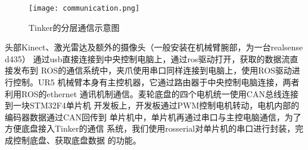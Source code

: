 \begin{figure}[ht] %
  \centering
  \texttt{[image: communication.png]}
  \caption{Tinker的分层通信示意图}
  \label{fig:communication}
\end{figure}

头部Kinect、激光雷达及额外的摄像头（一般安装在机械臂腕部，为一台realsense d435）
通过usb直接连接到中央控制电脑上，通过ros驱动打开，获取的数据流直接发布到
ROS的通信系统中，夹爪使用串口同样连接到电脑上，使用ROS驱动进行控制。UR5
机械臂本身有主控机器，它通过路由器于中央控制电脑连接，两者利用ROS的ethernet
通讯机制通信。麦轮底盘的四个电机统一使用CAN总线连接到一块STM32F4单片机
开发板上，开发板通过PWM控制电机转动，电机内部的编码器数据通过CAN回传到
单片机中，单片机再通过串口与主控电脑通信，为了方便底盘接入Tinker的通信
系统，我们使用rosserial对单片机的串口进行封装，完成控制底盘、获取底盘数据
的功能。












